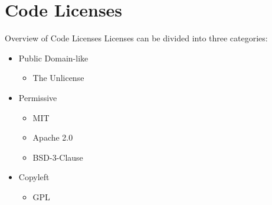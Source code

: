 \documentclass[compress,aspectratio=169]{beamer}
\begin{document}
  \section{Code Licenses}

	\begin{frame}{Overview of Code Licenses}
    Licenses can be divided into three categories:
		\begin{itemize}
      \item Public Domain-like
        \begin{itemize}
          \item The Unlicense
        \end{itemize}
			\item Permissive
        \begin{itemize}
          \item MIT
          \item Apache 2.0
          \item BSD-3-Clause
        \end{itemize}
      \item Copyleft
        \begin{itemize}
          \item GPL
        \end{itemize}
		\end{itemize}
	\end{frame}
\end{document}
